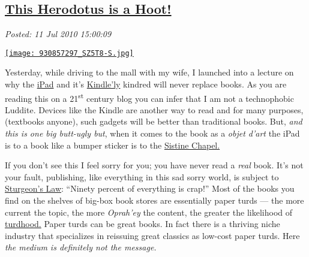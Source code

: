 %

\subsection*{\href{https://bakerjd99.wordpress.com/2010/07/11/this-herodotus-is-a-hoot/}{This Herodotus is a Hoot!}}


\noindent\emph{Posted: 11 Jul 2010 15:00:09}
\vspace{6pt}


\captionsetup[floatingfigure]{labelformat=empty}
\begin{floatingfigure}[l]{0.26\textwidth}
\centering
\href{http://www.openlettersmonthly.com/december-landfall/}{\texttt{[image: 930857297\_SZ5T8-S.jpg]}}
\label{fig:660X0}
\end{floatingfigure}Yesterday, while driving to the mall with my wife, I launched into a
lecture on why the
\href{http://news.cnet.com/8301-17852\_3-20004899-71.html}{iPad} and
it's
\href{http://www.amazon.com/Kindle-Wireless-Reading-Display-Globally/dp/B0015T963C}{Kindle'ly}
kindred will never replace books. As you are reading this on a 21\textsuperscript{st}
century blog you can infer that I am not a technophobic Luddite. Devices
like the Kindle are another way to read and for many purposes,
(textbooks anyone), such gadgets will be better than traditional books.
But, \emph{and this is one big butt-ugly but}, when it comes to the book
as a \emph{objet d'art} the iPad is to a book like a bumper sticker is
to the
\href{http://www.wga.hu/frames-e.html?/html/m/michelan/3sistina/}{Sistine
Chapel.}

If you don't see this I feel sorry for you; you have never read a
\emph{real} book. It's not your fault, publishing, like everything in
this sad sorry world, is subject to
\href{http://en.wikipedia.org/wiki/Sturgeon's\_Law}{Sturgeon's Law}:
``Ninety percent of everything is crap!'' Most of the books you find on
the shelves of big-box book stores are essentially paper turds --- the
more current the topic, the more \emph{Oprah'ey} the content, the
greater the likelihood of
\href{http://www.amazon.com/Dreams-My-Father-Story-Inheritance/dp/1400082773}{turdhood.}
Paper turds can be great books. In fact there is a thriving niche
industry that specializes in reissuing great classics as low-cost paper
turds. Here \emph{the medium is definitely not the message.}

